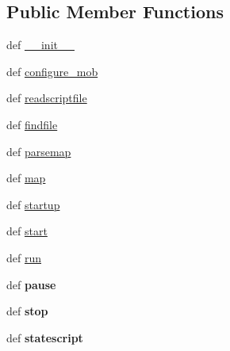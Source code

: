 \subsection*{Public Member Functions}
\begin{DoxyCompactItemize}
\item 
def \hyperlink{classcore_1_1mobility_1_1_ns2_scripted_mobility_af621d31686dcbc185444603e49058c01}{\+\_\+\+\_\+init\+\_\+\+\_\+}
\item 
def \hyperlink{classcore_1_1mobility_1_1_ns2_scripted_mobility_a869074863d1ac2e99f9ace9126822d1e}{configure\+\_\+mob}
\item 
def \hyperlink{classcore_1_1mobility_1_1_ns2_scripted_mobility_ab2202d88f90b3af1b6cbcfce1fbe2fdf}{readscriptfile}
\item 
def \hyperlink{classcore_1_1mobility_1_1_ns2_scripted_mobility_a8622f18f9fe52626cdf2c43f32505669}{findfile}
\item 
def \hyperlink{classcore_1_1mobility_1_1_ns2_scripted_mobility_a62bf6fb4c4b00fed51d1dc3bb09e0497}{parsemap}
\item 
def \hyperlink{classcore_1_1mobility_1_1_ns2_scripted_mobility_a98e2fefc4cf56682bbe0f4102aec238f}{map}
\item 
def \hyperlink{classcore_1_1mobility_1_1_ns2_scripted_mobility_afb62335674dec36c2f4bbab224029947}{startup}
\item 
def \hyperlink{classcore_1_1mobility_1_1_ns2_scripted_mobility_a0f579bbc96c141c479a49279beb0f780}{start}
\item 
def \hyperlink{classcore_1_1mobility_1_1_ns2_scripted_mobility_a5cbb85c94085b606e388f62cb70ec546}{run}
\item 
\hypertarget{classcore_1_1mobility_1_1_ns2_scripted_mobility_a01eb8d8e5d95b03c9c62ce2e1e926e02}{def {\bfseries pause}}\label{classcore_1_1mobility_1_1_ns2_scripted_mobility_a01eb8d8e5d95b03c9c62ce2e1e926e02}

\item 
\hypertarget{classcore_1_1mobility_1_1_ns2_scripted_mobility_ae930ca921a6c6d2401214ae53ad50c61}{def {\bfseries stop}}\label{classcore_1_1mobility_1_1_ns2_scripted_mobility_ae930ca921a6c6d2401214ae53ad50c61}

\item 
\hypertarget{classcore_1_1mobility_1_1_ns2_scripted_mobility_a42d061b4506819093d5345c15741155a}{def {\bfseries statescript}}\label{classcore_1_1mobility_1_1_ns2_scripted_mobility_a42d061b4506819093d5345c15741155a}

\end{DoxyCompactItemize}
